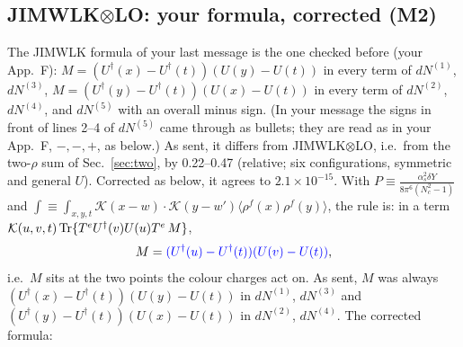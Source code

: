 \documentclass[10pt]{article}
\numberwithin{equation}{section}
\newcommand{\new}[1]{{\color{blue}#1}}
\newcommand{\old}[1]{{\color{red}#1}}
\begin{document}
\subsection{JIMWLK$\otimes$LO: your formula, corrected (M2)}
The JIMWLK formula of your last message is the one checked before (your App.~F): $M=(U^\dagger(x)-U^\dagger(t))(U(y)-U(t))$ in every term of $dN^{(1)}$, $dN^{(3)}$, $M=(U^\dagger(y)-U^\dagger(t))(U(x)-U(t))$ in every term of $dN^{(2)}$, $dN^{(4)}$, and $dN^{(5)}$ with an overall minus sign. (In your message the signs in front of lines 2--4 of $dN^{(5)}$ came through as bullets; they are read as in your App.~F, $-,-,+$, as below.) As sent, it differs from JIMWLK$\otimes$LO, i.e.\ from the two-$\rho$ sum of Sec.~\ref{sec:two}, by 0.22--0.47 (relative; six configurations, symmetric and general $U$). Corrected as below, it agrees to $2.1\times10^{-15}$.
With $P\equiv\frac{\alpha_s^2\delta Y}{8\pi^6(N_c^2-1)}$ and $\int\equiv\int_{x,y,t}\mathcal K(x-w)\cdot\mathcal K(y-w')\langle\rho^f(x)\rho^f(y)\rangle$, the rule is: in a term $\mathcal K(u,v,t)\,{\rm Tr}\{T^eU^\dagger(v)U(u)T^e\,M\}$,
\begin{equation*}
M=\new{(U^\dagger(u)-U^\dagger(t))(U(v)-U(t))},
\end{equation*}
i.e.\ $M$ sits at the two points the colour charges act on. As sent, $M$ was always \old{$(U^\dagger(x)-U^\dagger(t))(U(y)-U(t))$} in $dN^{(1)}$, $dN^{(3)}$ and \old{$(U^\dagger(y)-U^\dagger(t))(U(x)-U(t))$} in $dN^{(2)}$, $dN^{(4)}$. The corrected formula:
\end{document}
